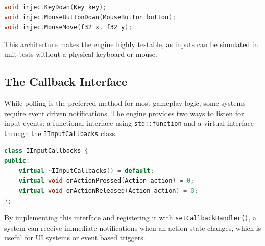 \begin{lstlisting}[language=C++]
void injectKeyDown(Key key);
void injectMouseButtonDown(MouseButton button);
void injectMouseMove(f32 x, f32 y);
\end{lstlisting}

This architecture makes the engine highly testable, as inputs can be simulated in unit tests without a physical keyboard or mouse.

\subsection{The Callback Interface}

While polling is the preferred method for most gameplay logic, some systems require event driven notifications. The engine provides two ways to listen for input events: a functional interface using \texttt{std::function} and a virtual interface through the \texttt{IInputCallbacks} class.

\begin{lstlisting}[language=C++]
class IInputCallbacks {
public:
    virtual ~IInputCallbacks() = default;
    virtual void onActionPressed(Action action) = 0;
    virtual void onActionReleased(Action action) = 0;
};
\end{lstlisting}

By implementing this interface and registering it with \texttt{setCallbackHandler()}, a system can receive immediate notifications when an action state changes, which is useful for UI systems or event based triggers.

